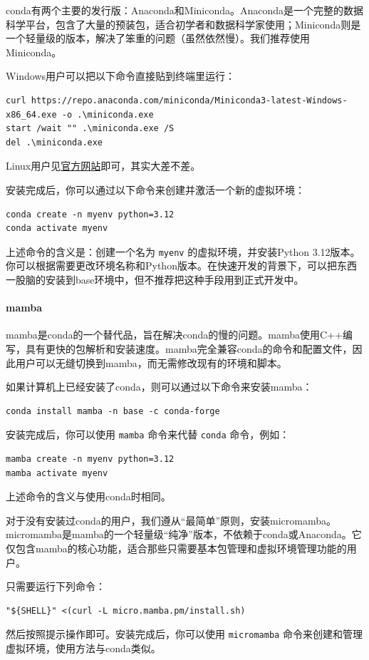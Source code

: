 conda有两个主要的发行版：Anaconda和Miniconda。Anaconda是一个完整的数据科学平台，包含了大量的预装包，适合初学者和数据科学家使用；Miniconda则是一个轻量级的版本，解决了笨重的问题（虽然依然慢）。我们推荐使用Miniconda。

Windows用户可以把以下命令直接贴到终端里运行：
\begin{verbatim}
curl https://repo.anaconda.com/miniconda/Miniconda3-latest-Windows-x86_64.exe -o .\miniconda.exe
start /wait "" .\miniconda.exe /S
del .\miniconda.exe
\end{verbatim}
Linux用户见\href{https://www.anaconda.com/docs/getting-started/miniconda/install}{官方网站}即可，其实大差不差。

安装完成后，你可以通过以下命令来创建并激活一个新的虚拟环境：
\begin{verbatim}
conda create -n myenv python=3.12
conda activate myenv
\end{verbatim}
上述命令的含义是：创建一个名为 \texttt{myenv} 的虚拟环境，并安装Python 3.12版本。你可以根据需要更改环境名称和Python版本。在快速开发的背景下，可以把东西一股脑的安装到base环境中，但不推荐把这种手段用到正式开发中。

\paragraph{mamba} mamba是conda的一个替代品，旨在解决conda的慢的问题。mamba使用C++编写，具有更快的包解析和安装速度。mamba完全兼容conda的命令和配置文件，因此用户可以无缝切换到mamba，而无需修改现有的环境和脚本。

如果计算机上已经安装了conda，则可以通过以下命令来安装mamba：
\begin{verbatim}
conda install mamba -n base -c conda-forge
\end{verbatim}
安装完成后，你可以使用 \texttt{mamba} 命令来代替 \texttt{conda} 命令，例如：
\begin{verbatim}
mamba create -n myenv python=3.12
mamba activate myenv  
\end{verbatim}
上述命令的含义与使用conda时相同。

对于没有安装过conda的用户，我们遵从“最简单”原则，安装micromamba。micromamba是mamba的一个轻量级“纯净”版本，不依赖于conda或Anaconda。它仅包含mamba的核心功能，适合那些只需要基本包管理和虚拟环境管理功能的用户。

只需要运行下列命令：
\begin{verbatim}
"${SHELL}" <(curl -L micro.mamba.pm/install.sh)
\end{verbatim}
然后按照提示操作即可。安装完成后，你可以使用 \texttt{micromamba} 命令来创建和管理虚拟环境，使用方法与conda类似。

